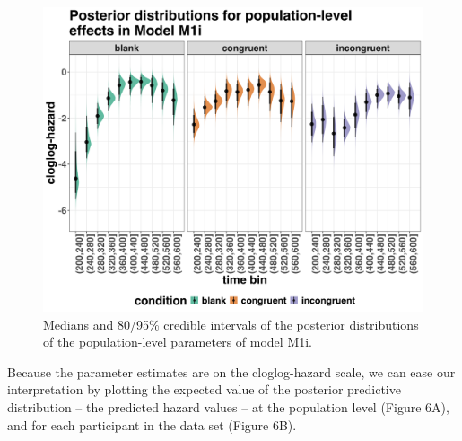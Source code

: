 \documentclass[
  man, donotrepeattitle,floatsintext]{apa6}
\begin{document}
\begin{figure}[H]

{\centering \includegraphics[width=0.8\linewidth,height=0.67\textheight,]{../Tutorial_2_Bayesian/figures/M1i_postdistr} 

}

\caption{Medians and 80/95\% credible intervals of the posterior distributions of the population-level parameters of model M1i.}\label{fig:plot-fixed-effects}
\end{figure}

Because the parameter estimates are on the cloglog-hazard scale, we can ease our interpretation by plotting the expected value of the posterior predictive distribution -- the predicted hazard values -- at the population level (Figure 6A), and for each participant in the data set (Figure 6B).
\end{document}
